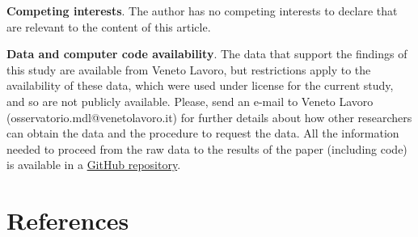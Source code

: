 \documentclass[
  11pt]{article}
\begin{document}
\textbf{Competing interests}. The author has no competing interests to
declare that are relevant to the content of this article.

\textbf{Data and computer code availability}. The data that support the
findings of this study are available from Veneto Lavoro, but
restrictions apply to the availability of these data, which were used
under license for the current study, and so are not publicly available.
Please, send an e-mail to Veneto Lavoro
(osservatorio.mdl@venetolavoro.it) for further details about how other
researchers can obtain the data and the procedure to request the data.
All the information needed to proceed from the raw data to the results
of the paper (including code) is available in a
\href{https://github.com/ajunquera/moremoney}{GitHub repository}.

\section*{References}\label{references}
\end{document}
